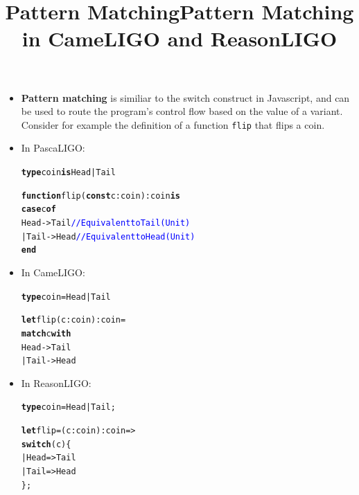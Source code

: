 \documentclass[wide]{slides}
\newcommand{\Kcase}[0]{\textbf{case}\xspace}
\newcommand{\Kconst}[0]{\textbf{const}\xspace}
\newcommand{\Kend}[0]{\textbf{end}\xspace}
\newcommand{\Kfunction}[0]{\textbf{function}\xspace}
\newcommand{\Kis}[0]{\textbf{is}\xspace}
\newcommand{\Kof}[0]{\textbf{of}\xspace}
\newcommand{\Ktype}[0]{\textbf{type}\xspace}
\newcommand{\Kwith}[0]{\textbf{with}\xspace}
\newcommand{\Klet}[0]{\textbf{let}\xspace}
\newcommand{\Kmatch}[0]{\textbf{match}\xspace}
\newcommand{\Kswitch}[0]{\textbf{switch}\xspace}
\newcommand{\com}[1]{\textcolor{blue}{{#1}}}
\begin{document}
\begin{slide}
  \title{Pattern Matching}

  \begin{itemize}

    \item \textbf{Pattern matching} is similiar to the switch
      construct in Javascript, and can be used to route the program's
      control flow based on the value of a variant. Consider for
      example the definition of a function \texttt{flip} that flips a
      coin.

    \item In PascaLIGO:
      \begin{alltt}
\Ktype coin \Kis Head | Tail

\Kfunction flip (\Kconst c : coin) : coin \Kis
  \Kcase c \Kof
    Head -> Tail \com{// Equivalent to Tail (Unit)}
  | Tail -> Head \com{// Equivalent to Head (Unit)}
  \Kend
      \end{alltt}

  \end{itemize}

\end{slide}

\begin{slide}
  \title{Pattern Matching in CameLIGO and ReasonLIGO}

  \begin{itemize}

    \item In CameLIGO:
      \begin{alltt}
\Ktype coin = Head | Tail

\Klet flip (c : coin) : coin =
  \Kmatch c \Kwith
    Head -> Tail
  | Tail -> Head
      \end{alltt}

    \item In ReasonLIGO:
      \begin{alltt}
\Ktype coin = Head | Tail;

\Klet flip = (c : coin) : coin =>
  \Kswitch (c) \{
  | Head => Tail
  | Tail => Head
  \};
      \end{alltt}

  \end{itemize}

\end{slide}
\end{document}
